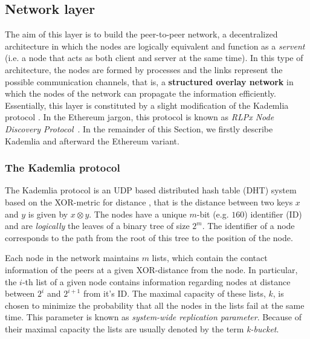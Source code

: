 \subsection{Network layer}
\label{sec:network-layer}

The aim of this layer is to build the peer-to-peer network, a decentralized
architecture in which the nodes are logically equivalent and function as a
\emph{servent} (i.e. a node that acts as both client and server at the same
time). In this type of architecture, the nodes are formed by processes and the
links represent the possible communication channels, that is, a
\textbf{structured overlay network} \cite{van2017distributed} in which the nodes
of the network can propagate the information efficiently. Essentially, this
layer is constituted by a slight modification of the Kademlia protocol
\cite{bib:kademlia}. In the Ethereum jargon, this protocol is known as
\emph{RLPx Node Discovery Protocol}~\cite{bib:rlpx-discovery-protocol}. In the
remainder of this Section, we firstly describe Kademlia and afterward the
Ethereum variant.


\subsubsection{The Kademlia protocol}
The Kademlia protocol is an UDP based distributed hash table (DHT) system based
on the XOR-metric for distance \cite{bib:kademlia}, that is the distance between
two keys $x$ and $y$ is given by $x \otimes y$. The nodes have a unique $m$-bit
(e.g. $160$) identifier (ID) and are \emph{logically} the leaves of a binary
tree of size $2^m$. The identifier of a node corresponds to the path from the
root of this tree to the position of the node.

Each node in the network maintains $m$ lists, which contain the contact
information of the peers at a given XOR-distance from the node. In particular,
the $i$-th list of a given node contains information regarding nodes at distance
between $2^i$ and $2^{i+1}$ from it's ID. The maximal capacity of these lists,
$k$, is chosen to minimize the probability that all the nodes in the lists fail
at the same time. This parameter is  known as \emph{system-wide replication
parameter}. Because of their maximal capacity the lists are usually denoted by
the term \emph{k-bucket}.

